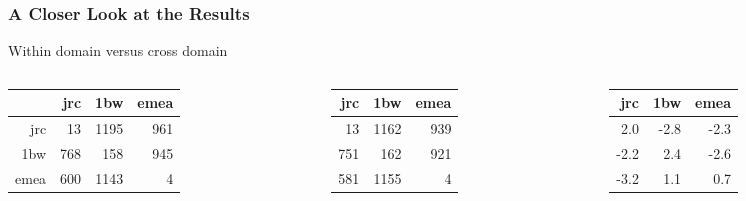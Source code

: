 \documentclass{beamer}
\begin{document}
\begin{frame}
    \frametitle{A Closer Look at the Results}

    \begin{block}{Within domain versus cross domain}
        {\small
        \begin{columns}[T,totalwidth=\textwidth]
            \begin{column}{0.4\textwidth}
                \begin{tabular}{rrrr}
                        & jrc & 1bw  & emea \\ \hline
                    jrc & 13  & 1195 & 961 \\
                    1bw & 768 & 158  & 945 \\
                    emea& 600 & 1143 & 4
                \end{tabular}
            \end{column}
            \begin{column}{0.3\textwidth}
                \begin{tabular}{rrr}
                    jrc & 1bw  & emea \\ \hline
                    13  & 1162 & 939 \\
                    751 & 162  & 921 \\
                    581 & 1155 & 4
                \end{tabular}
            \end{column}
            \begin{column}{0.3\textwidth}
                \begin{tabular}{rrr}
                    jrc & 1bw & emea \\ \hline
                    2.0 & -2.8 & -2.3 \\
                    -2.2 & 2.4 & -2.6 \\
                    -3.2 & 1.1 & 0.7
                \end{tabular}
            \end{column}
        \end{columns}
        }
    \end{block}


\end{frame}
\end{document}
